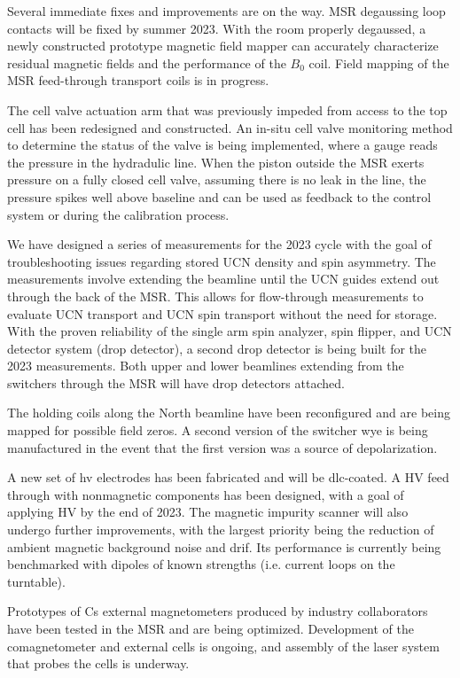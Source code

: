 Several immediate fixes and improvements are on the way. MSR degaussing loop contacts will be fixed by summer 2023. With the room properly degaussed, a newly constructed prototype magnetic field mapper can accurately characterize residual magnetic fields and the performance of the $B_0$ coil. Field mapping of the MSR feed-through transport coils is in progress. 

The cell valve actuation arm that was previously impeded from access to the top cell has been redesigned and constructed. An in-situ cell valve monitoring method to determine the status of the valve is being implemented, where a gauge reads the pressure in the hydradulic line. When the piston outside the MSR exerts pressure on a fully closed cell valve, assuming there is no leak in the line, the pressure spikes well above baseline and can be used as feedback to the control system or during the calibration process.

We have designed a series of measurements for the 2023 cycle with the goal of troubleshooting issues regarding stored UCN density and spin asymmetry. The measurements involve extending the beamline until the UCN guides extend out through the back of the MSR. This allows for flow-through measurements to evaluate UCN transport and UCN spin transport without the need for storage. With the proven reliability of the single arm spin analyzer, spin flipper, and UCN detector system (drop detector), a second drop detector is being built for the 2023 measurements. Both upper and lower beamlines extending from the switchers through the MSR will have drop detectors attached. 

The holding coils along the North beamline have been reconfigured and are being mapped for possible field zeros. A second version of the switcher wye is being manufactured in the event that the first version was a source of depolarization.

A new set of \acrshort{hv} electrodes has been fabricated and will be \acrshort{dlc}-coated. A HV feed through with nonmagnetic components has been designed, with a goal of applying HV by the end of 2023. The magnetic impurity scanner will also undergo further improvements, with the largest priority being the reduction of ambient magnetic background noise and drif. Its performance is currently being benchmarked with dipoles of known strengths (i.e. current loops on the turntable).

Prototypes of Cs external magnetometers produced by industry collaborators have been tested in the MSR and are being optimized. Development of the \hg comagnetometer and external \hg cells is ongoing, and assembly of the laser system that probes the \hg cells is underway.
